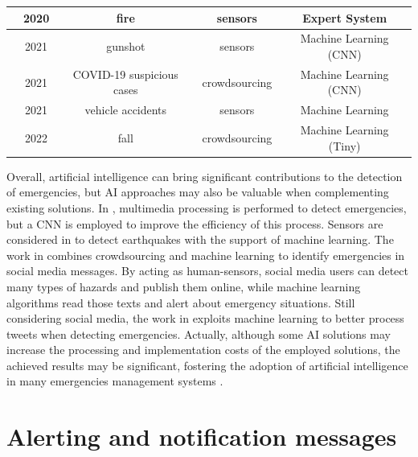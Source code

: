 \begin{refsection}
\begin{table}
\begin{tabular}{|c|c|c|c|c|}
    \hline
    \citeauthor{ExpertFire1} \cite{ExpertFire1} & 2020 & fire & sensors & Expert System \\
    
    \hline
    \citeauthor{cnn2} \cite{cnn2} & 2021 & gunshot & sensors & Machine Learning (CNN) \\
    
    \hline
    \citeauthor{MachineCovidVoice} \cite{MachineCovidVoice} & 2021 & COVID-19 suspicious cases & crowdsourcing & Machine Learning (CNN) \\
    
    \hline
    \citeauthor{MachineVehicleAccident} \cite{MachineVehicleAccident} & 2021 & vehicle accidents & sensors & Machine Learning \\
    
    \hline
    \citeauthor{TinyMachineFall} \cite{TinyMachineFall} & 2022 & fall & crowdsourcing & Machine Learning (Tiny) \\
\end{tabular}
\end{table}

Overall, artificial intelligence can bring significant contributions to the detection of emergencies, but AI approaches may also be valuable when complementing existing solutions. In \cite{visualdataEmergency4}, multimedia processing is performed to detect emergencies, but a CNN is employed to improve the efficiency of this process. Sensors are considered in \cite{iotEarthquake2} to detect earthquakes with the support of machine learning. The work in \cite{Alkhatib2019771} combines crowdsourcing and machine learning to identify emergencies in social media messages. By acting as human-sensors, social media users can detect many types of hazards and publish them online, while machine learning algorithms read those texts and alert about emergency situations. Still considering social media, the work in \cite{twitter3} exploits machine learning to better process tweets when detecting emergencies. Actually, although some AI solutions may increase the processing and implementation costs of the employed solutions, the achieved results may be significant, fostering the adoption of artificial intelligence in many emergencies management systems \cite{surveyAI1,surveyAI2,iaHumanCentered}.


\section {Alerting and notification messages}
\label{sec5}


\end{refsection}
